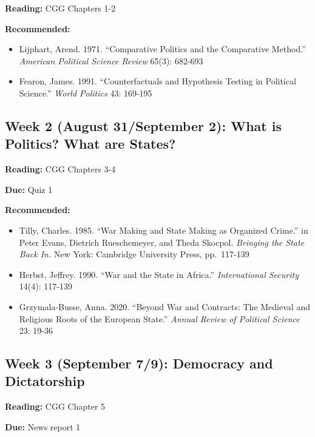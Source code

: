 \documentclass[
  11pt,
]{article}
\providecommand{\tightlist}{%
  \setlength{\itemsep}{0pt}\setlength{\parskip}{0pt}}
\begin{document}
\textbf{Reading:} CGG Chapters 1-2

\textbf{Recommended:}

\begin{itemize}
\tightlist
\item
  Lijphart, Arend. 1971. ``Comparative Politics and the Comparative
  Method.'' \emph{American Political Science Review} 65(3): 682-693
\item
  Fearon, James. 1991. ``Counterfactuals and Hypothesis Testing in
  Political Science.'' \emph{World Politics} 43: 169-195
\end{itemize}

\hypertarget{week-2-august-31september-2-what-is-politics-what-are-states}{%
\subsection{Week 2 (August 31/September 2): What is Politics? What are
States?}\label{week-2-august-31september-2-what-is-politics-what-are-states}}

\textbf{Reading:} CGG Chapters 3-4

\textbf{Due:} Quiz 1

\textbf{Recommended:}

\begin{itemize}
\tightlist
\item
  Tilly, Charles. 1985. ``War Making and State Making as Organized
  Crime.'' in Peter Evans, Dietrich Rueschemeyer, and Theda Skocpol.
  \emph{Bringing the State Back In.} New York: Cambridge University
  Press, pp.~117-139
\item
  Herbst, Jeffrey. 1990. ``War and the State in Africa.''
  \emph{International Security} 14(4): 117-139
\item
  Grzymala-Busse, Anna. 2020. ``Beyond War and Contracts: The Medieval
  and Religious Roots of the European State.'' \emph{Annual Review of
  Political Science} 23: 19-36
\end{itemize}

\hypertarget{week-3-september-79-democracy-and-dictatorship}{%
\subsection{Week 3 (September 7/9): Democracy and
Dictatorship}\label{week-3-september-79-democracy-and-dictatorship}}

\textbf{Reading:} CGG Chapter 5

\textbf{Due:} News report 1
\end{document}
